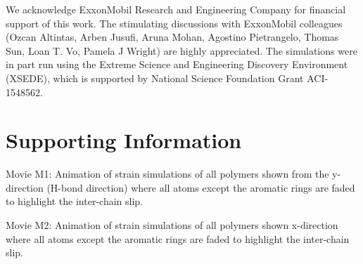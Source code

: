 \documentclass[journal=langd5,manuscript=article]{achemso}
\newcommand{\beginsupplement}{%
        \setcounter{table}{0}
        \setlength{\tabcolsep}{10pt}
        \setlength{\arrayrulewidth}{1mm}%
        \renewcommand{\arraystretch}{1.5}
        \renewcommand{\thetable}{S\arabic{table}}%
        \setcounter{figure}{0}
        \renewcommand{\thefigure}{S\arabic{figure}}%
     }
\begin{document}
%
\begin{acknowledgement}
We acknowledge ExxonMobil Research and Engineering Company for financial support of this work. The stimulating discussions with ExxonMobil colleagues (Ozcan Altintas, Arben Jusufi, Aruna Mohan, Agostino Pietrangelo, Thomas Sun, Loan T. Vo, Pamela J Wright) are highly appreciated. The simulations were in part run using the Extreme Science and Engineering Discovery Environment (XSEDE), which is supported by National Science Foundation Grant ACI-1548562.
\end{acknowledgement}


\FloatBarrier


\pagebreak

\beginsupplement

\section{Supporting Information}

Movie M1: Animation of strain simulations of all polymers shown from the y-direction (H-bond direction) where all atoms except the aromatic rings are faded to highlight the inter-chain slip.

\noindent Movie M2: Animation of strain simulations of all polymers shown x-direction where all atoms except the aromatic rings are faded to highlight the inter-chain slip.
\end{document}
